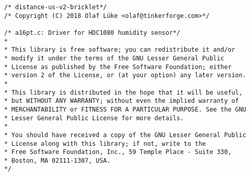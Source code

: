 \begin{lstlisting}
/* distance-us-v2-bricklet*/
/* Copyright (C) 2018 Olaf Lüke <olaf@tinkerforge.com>*/

/* a16pt.c: Driver for HDC1080 humidity sensor*/
*
* This library is free software; you can redistribute it and/or
* modify it under the terms of the GNU Lesser General Public
* License as published by the Free Software Foundation; either
* version 2 of the License, or (at your option) any later version.
*
* This library is distributed in the hope that it will be useful,
* but WITHOUT ANY WARRANTY; without even the implied warranty of
* MERCHANTABILITY or FITNESS FOR A PARTICULAR PURPOSE. See the GNU
* Lesser General Public License for more details.
*
* You should have received a copy of the GNU Lesser General Public
* License along with this library; if not, write to the
* Free Software Foundation, Inc., 59 Temple Place - Suite 330,
* Boston, MA 02111-1307, USA.
*/


\end{lstlisting}
